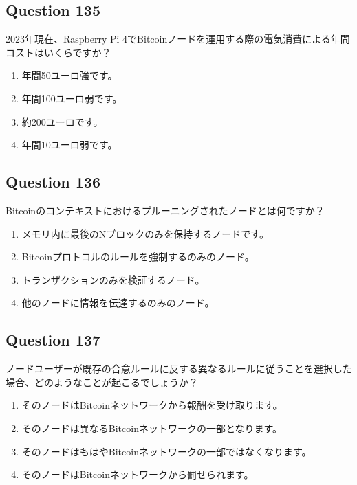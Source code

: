 \documentclass[12pt,a4paper]{article}
\begin{document}
\bigskip


\subsection*{Question 135}
2023年現在、Raspberry Pi 4でBitcoinノードを運用する際の電気消費による年間コストはいくらですか？

\begin{enumerate}[label=\Alph*., leftmargin=*]
\item 年間50ユーロ強です。
\item 年間100ユーロ弱です。
\item 約200ユーロです。
\item 年間10ユーロ弱です。
\end{enumerate}

\bigskip


\subsection*{Question 136}
Bitcoinのコンテキストにおけるプルーニングされたノードとは何ですか？

\begin{enumerate}[label=\Alph*., leftmargin=*]
\item メモリ内に最後のNブロックのみを保持するノードです。
\item Bitcoinプロトコルのルールを強制するのみのノード。
\item トランザクションのみを検証するノード。
\item 他のノードに情報を伝達するのみのノード。
\end{enumerate}

\bigskip


\subsection*{Question 137}
ノードユーザーが既存の合意ルールに反する異なるルールに従うことを選択した場合、どのようなことが起こるでしょうか？

\begin{enumerate}[label=\Alph*., leftmargin=*]
\item そのノードはBitcoinネットワークから報酬を受け取ります。
\item そのノードは異なるBitcoinネットワークの一部となります。
\item そのノードはもはやBitcoinネットワークの一部ではなくなります。
\item そのノードはBitcoinネットワークから罰せられます。
\end{enumerate}
\end{document}
